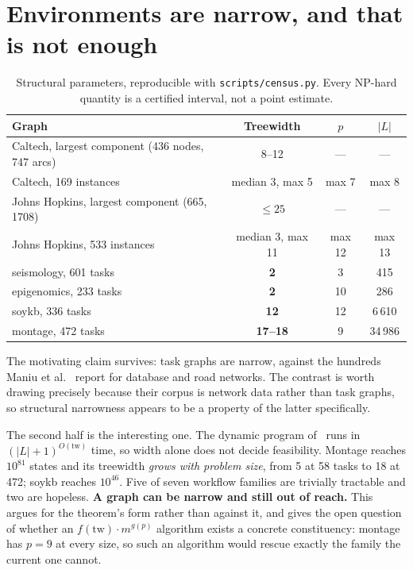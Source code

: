 \documentclass{article}
\newcommand{\tw}{\mathrm{tw}}
\begin{document}
\section{Environments are narrow, and that is not enough}
\label{sec:c1}

\begin{table}[t]
\caption{Structural parameters, reproducible with \texttt{scripts/census.py}. Every
NP-hard quantity is a certified interval, not a point estimate.}
\label{tab:structure}
\centering
\begin{tabular}{lccc}
\toprule
Graph & Treewidth & $p$ & $|L|$ \\
\midrule
Caltech, largest component (436 nodes, 747 arcs) & 8--12 & --- & --- \\
Caltech, 169 instances            & median 3, max 5  & max 7  & max 8 \\
Johns Hopkins, largest component (665, 1708) & $\leq 25$ & --- & --- \\
Johns Hopkins, 533 instances      & median 3, max 11 & max 12 & max 13 \\
\midrule
seismology, 601 tasks             & \textbf{2}      & 3  & 415 \\
epigenomics, 233 tasks            & \textbf{2}      & 10 & 286 \\
soykb, 336 tasks                  & \textbf{12}     & 12 & 6\,610 \\
montage, 472 tasks                & \textbf{17--18} & 9  & 34\,986 \\
\bottomrule
\end{tabular}
\end{table}

The motivating claim survives: task graphs are narrow, against the hundreds Maniu
et al.~\cite{maniu2019} report for database and road networks. The contrast is worth
drawing precisely because their corpus is network data rather than task graphs, so
structural narrowness appears to be a property of the latter specifically.

The second half is the interesting one. The dynamic program of~\cite{belova2026}
runs in $(|L|+1)^{O(\tw)}$ time, so width alone does not decide feasibility. Montage
reaches $10^{81}$ states and its treewidth \emph{grows with problem size}, from 5 at
58 tasks to 18 at 472; soykb reaches $10^{46}$. Five of seven workflow families are
trivially tractable and two are hopeless. \textbf{A graph can be narrow and still out
of reach.} This argues for the theorem's form rather than against it, and gives the
open question of whether an $f(\tw) \cdot m^{g(p)}$ algorithm exists a concrete
constituency: montage has $p = 9$ at every size, so such an algorithm would rescue
exactly the family the current one cannot.
\end{document}
